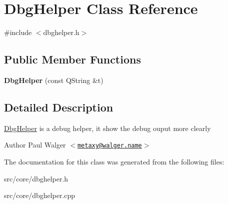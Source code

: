 \hypertarget{classDbgHelper}{
\section{DbgHelper Class Reference}
\label{classDbgHelper}
}


{\ttfamily \#include $<$dbghelper.h$>$}\subsection*{Public Member Functions}
\begin{DoxyCompactItemize}
\item 
\hypertarget{classDbgHelper_ad592120d919e04305d93c0aff04fd85f}{
{\bfseries DbgHelper} (const QString \&t)}
\label{classDbgHelper_ad592120d919e04305d93c0aff04fd85f}

\end{DoxyCompactItemize}


\subsection{Detailed Description}
\hyperlink{classDbgHelper}{DbgHelper} is a debug helper, it show the debug ouput more clearly

\begin{DoxyAuthor}{Author}
Paul Walger $<$\href{mailto:metaxy@walger.name}{\tt metaxy@walger.name}$>$ 
\end{DoxyAuthor}


The documentation for this class was generated from the following files:\begin{DoxyCompactItemize}
\item 
src/core/dbghelper.h\item 
src/core/dbghelper.cpp\end{DoxyCompactItemize}
